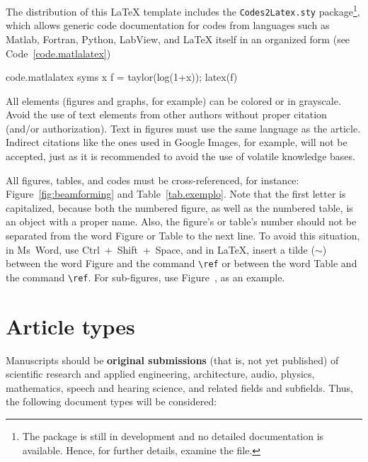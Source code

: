 \documentclass[12pt, a4paper, twoside, twocolumn]{article}
\begin{document}
The distribution of this \LaTeX\xspace template includes the \texttt{Codes2Latex.sty} package\footnote{The package is still in development and no detailed documentation is available. Hence, for further details, examine the  file.}, which allows generic code documentation for codes from languages such as Matlab, Fortran, Python, LabView, and \LaTeX{} itself in an organized form (see Code~\ref{code.matlalatex})

\begin{matlabcode}{code.matlalatex}
  syms x
  f = taylor(log(1+x));
  latex(f)
\end{matlabcode}

All elements (figures and graphs, for example) can be colored or in grayscale. Avoid the use of text elements from other authors without proper citation (and/or authorization). Text in figures must use the same language as the article. Indirect citations like the ones used in Google Images, for example, will not be accepted, just as it is recommended to avoid the use of volatile knowledge bases.

All figures, tables, and codes must be cross-referenced, for instance: Figure~\ref{fig:beamforming} and Table~\ref{tab.exemplo}. Note that the first letter is capitalized, because both the numbered figure, as well as the numbered table, is an object with a proper name. Also, the figure's or table's number should not be separated from the word Figure or Table to the next line. To avoid this situation, in Ms~Word, use Ctrl~+~Shift~+~Space, and in \LaTeX, insert a tilde ($\sim$) between the word Figure and the command \verb=\ref= or between the word Table and the command \verb=\ref=.
%
For sub-figures, use Figure~, as an example.

\section{Article types}

Manuscripts should be \textbf{original submissions} (that is, not yet published) of scientific research and applied engineering, architecture, audio, physics, mathematics, speech and hearing science, and related fields and subfields. Thus, the following document types will be considered:
\end{document}
